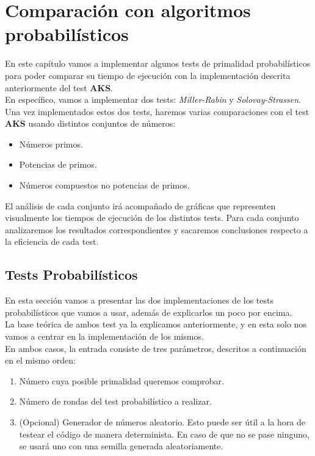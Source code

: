 \chapter{Comparación con algoritmos probabilísticos}

En este capítulo vamos a implementar algunos tests de primalidad probabilísticos para poder comparar su tiempo de ejecución con la implementación descrita anteriormente del test \textbf{AKS}.\\

En específico, vamos a implementar dos tests: \textit{Miller-Rabin} y \textit{Solovay-Strassen}. Una vez implementados estos dos tests, haremos varias comparaciones con el test \textbf{AKS} usando distintos conjuntos de números:

\begin{itemize}
	\item Números primos.
	\item Potencias de primos.
	\item Números compuestos no potencias de primos.
\end{itemize}

El análisis de cada conjunto irá acompañado de gráficas que representen visualmente los tiempos de ejecución de los distintos tests. Para cada conjunto analizaremos los resultados correspondientes y sacaremos conclusiones respecto a la eficiencia de cada test.

\section{Tests Probabilísticos}

En esta sección vamos a presentar las dos implementaciones de los tests probabilísticos que vamos a usar, además de explicarlos un poco por encima.\\

La base teórica de ambos test ya la explicamos anteriormente, y en esta solo nos vamos a centrar en la implementación de los mismos.\\

En ambos casos, la entrada consiste de tres parámetros, descritos a continuación en el mismo orden:

\begin{enumerate}
	\item Número cuya posible primalidad queremos comprobar.
	\item Número de rondas del test probabilístico a realizar.
	\item (Opcional) Generador de números aleatorio. Esto puede ser útil a la hora de testear el código de manera determinista. En caso de que no se pase ninguno, se usará uno con una semilla generada aleatoriamente.
\end{enumerate}

